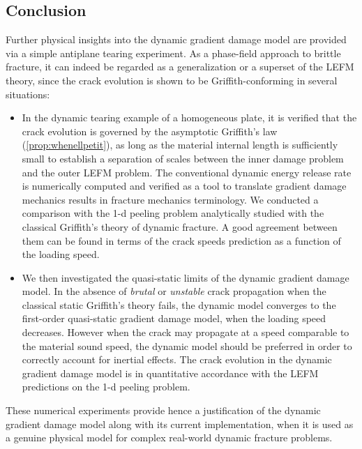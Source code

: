 \subsection*{Conclusion}
Further physical insights into the dynamic gradient damage model are provided via a simple antiplane tearing experiment. As a phase-field approach to brittle fracture, it can indeed be regarded as a generalization or a superset of the LEFM theory, since the crack evolution is shown to be Griffith-conforming in several situations:
\begin{itemize}
\item In the dynamic tearing example of a homogeneous plate, it is verified that the crack evolution is governed by the asymptotic Griffith's law (\cref{prop:whenellpetit}), as long as the material internal length is sufficiently small to establish a separation of scales between the inner damage problem and the outer LEFM problem. The conventional dynamic energy release rate is numerically computed and verified as a tool to translate gradient damage mechanics results in fracture mechanics terminology. We conducted a comparison with the 1-d peeling problem \cite{DumouchelMarigoCharlotte:2008} analytically studied with the classical Griffith's theory of dynamic fracture. A good agreement between them can be found in terms of the crack speeds prediction as a function of the loading speed.

\item We then investigated the quasi-static limits of the dynamic gradient damage model. In the absence of \emph{brutal} or \emph{unstable} crack propagation when the classical static Griffith's theory fails, the dynamic model converges to the first-order quasi-static gradient damage model, when the loading speed decreases. However when the crack may propagate at a speed comparable to the material sound speed, the dynamic model should be preferred in order to correctly account for inertial effects. The crack evolution in the dynamic gradient damage model is in quantitative accordance with the LEFM predictions on the 1-d peeling problem.
\end{itemize}

These numerical experiments provide hence a justification of the dynamic gradient damage model along with its current implementation, when it is used as a genuine physical model for complex real-world dynamic fracture problems.

